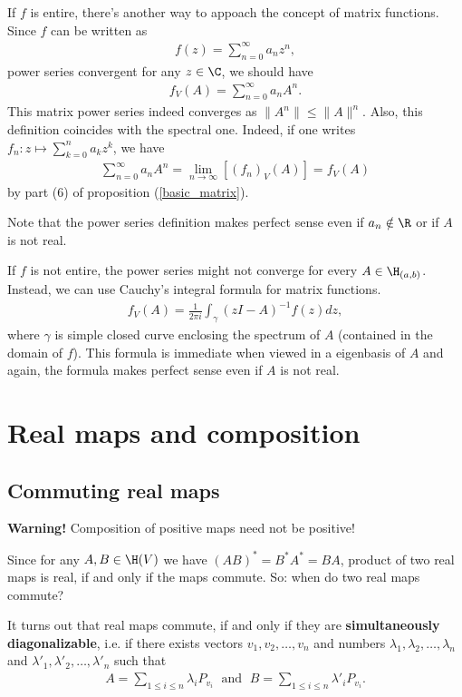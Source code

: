 If $f$ is entire, there's another way to appoach the concept of matrix functions. Since $f$ can be written as
\begin{align*}
	f(z) = \sum_{n = 0}^{\infty} a_{n} z^{n},
\end{align*}
power series convergent for any $z \in \C$, we should have
\begin{align*}
	f_{V}(A) = \sum_{n = 0}^{\infty} a_{n} A^{n}.
\end{align*}
This matrix power series indeed converges as $\|A^{n}\| \leq \|A\|^{n}$. Also, this definition coincides with the spectral one. Indeed, if one writes $f_{n} : z \mapsto  \sum_{k = 0}^{n} a_{k} z^{k}$, we have
\begin{align*}
	\sum_{n = 0}^{\infty}a_{n} A^{n} = \lim_{n \to \infty} \left[(f_{n})_{V}(A) \right] = f_{V}(A)
\end{align*}
by part (6) of proposition (\ref{basic_matrix}).

Note that the power series definition makes perfect sense even if $a_{n} \notin \R$ or if $A$ is not real.

If $f$ is not entire, the power series might not converge for every $A \in \H_{(a, b)}$. Instead, we can use Cauchy's integral formula for matrix functions.
\begin{align*}
	f_{V}(A) = \frac{1}{2 \pi i}\int_{\gamma} (z I - A)^{-1} f(z) dz,
\end{align*}
where $\gamma$ is simple closed curve enclosing the spectrum of $A$ (contained in the domain of $f$). This formula is immediate when viewed in a eigenbasis of $A$ and again, the formula makes perfect sense even if $A$ is not real.

\section{Real maps and composition}

\subsection{Commuting real maps}

\textbf{Warning!} Composition of positive maps need not be positive!

Since for any $A, B \in \H(V)$ we have $(A B)^{*} = B^{*} A^{*} = B A$, product of two real maps is real, if and only if the maps commute. So: when do two real maps commute?

It turns out that real maps commute, if and only if they are \textbf{simultaneously diagonalizable}, i.e. if there exists vectors $v_{1}, v_{2}, \ldots, v_{n}$ and numbers $\lambda_{1}, \lambda_{2}, \ldots, \lambda_{n}$ and $\lambda'_{1}, \lambda'_{2}, \ldots, \lambda'_{n}$ such that
\begin{align*}
	A = \sum_{1 \leq i \leq n} \lambda_{i} P_{v_{i}} \; \text{ and } \; B = \sum_{1 \leq i \leq n} \lambda'_{i} P_{v_{i}}.
\end{align*}

